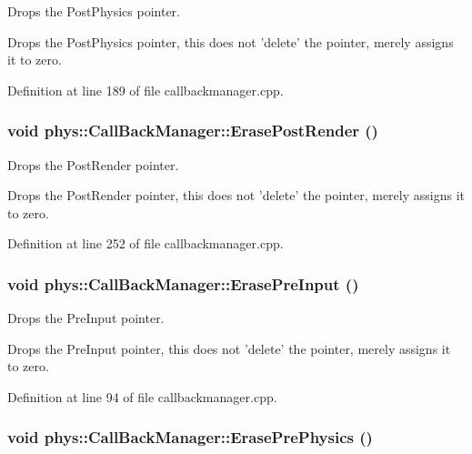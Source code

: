 Drops the PostPhysics pointer. 

Drops the PostPhysics pointer, this does not 'delete' the pointer, merely assigns it to zero. 

Definition at line 189 of file callbackmanager.cpp.

\hypertarget{classphys_1_1CallBackManager_a0eef22a8df4dc87289a18f0e6a1d0baf}{
\subsubsection[{ErasePostRender}]{\setlength{\rightskip}{0pt plus 5cm}void phys::CallBackManager::ErasePostRender ()}}
\label{d1/d47/classphys_1_1CallBackManager_a0eef22a8df4dc87289a18f0e6a1d0baf}


Drops the PostRender pointer. 

Drops the PostRender pointer, this does not 'delete' the pointer, merely assigns it to zero. 

Definition at line 252 of file callbackmanager.cpp.

\hypertarget{classphys_1_1CallBackManager_ae3da6f1eb10cdf4d8551aaeeda73053c}{
\subsubsection[{ErasePreInput}]{\setlength{\rightskip}{0pt plus 5cm}void phys::CallBackManager::ErasePreInput ()}}
\label{d1/d47/classphys_1_1CallBackManager_ae3da6f1eb10cdf4d8551aaeeda73053c}


Drops the PreInput pointer. 

Drops the PreInput pointer, this does not 'delete' the pointer, merely assigns it to zero. 

Definition at line 94 of file callbackmanager.cpp.

\hypertarget{classphys_1_1CallBackManager_afaeba4d6ae245d1560b76799417cce40}{
\subsubsection[{ErasePrePhysics}]{\setlength{\rightskip}{0pt plus 5cm}void phys::CallBackManager::ErasePrePhysics ()}}
\label{d1/d47/classphys_1_1CallBackManager_afaeba4d6ae245d1560b76799417cce40}


